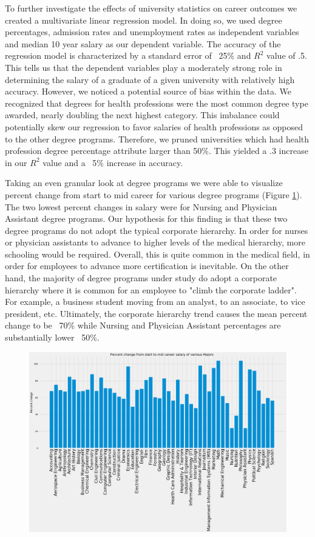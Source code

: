To further investigate the effects of university statistics on career outcomes we created a multivariate linear regression model.
In doing so, we used degree percentages, admission rates and unemployment rates as independent variables and median 10 year salary as our dependent variable.
The accuracy of the regression model is characterized by a standard error of ~25\% and $R^2$ value of .5. This tells us that the dependent variables play a moderately strong role in determining the salary of a graduate of a given university with relatively high accuracy. However, we noticed a potential source of bias within the data. We recognized that degrees for health professions were the most common degree type awarded, nearly doubling the next highest category. This imbalance could potentially skew our regression to favor salaries of health professions as opposed to the other degree programs. Therefore, we pruned universities which had health profession degree percentage attribute larger than 50\%. This yielded a .3 increase in our $R^2$ value and a ~5\% increase in accuracy.

Taking an even granular look at degree programs we were able to visualize percent change from start to mid career for various degree programs (Figure \ref{fig:test4}). The two lowest percent changes in salary were for Nursing and Physician Assistant degree programs. Our hypothesis for this finding is that these two degree programs do not adopt the typical corporate hierarchy. In order for nurses or physician assistants to advance to higher levels of the medical hierarchy, more schooling would be required. Overall, this is quite common in the medical field, in order for employees to advance more certification is inevitable. On the other hand, the majority of degree programs under study do adopt a corporate hierarchy where it is common for an employee to  "climb the corporate ladder". For example, a business student moving from an analyst, to an associate, to vice president, etc. Ultimately, the corporate hierarchy trend causes the mean percent change to be ~70\% while Nursing and Physician Assistant percentages are substantially lower ~50\%. 
\begin{figure} 
	  \includegraphics[width=\textwidth]{images/major_pct_chg.png}
	\label{fig:test4}
\end{figure}


